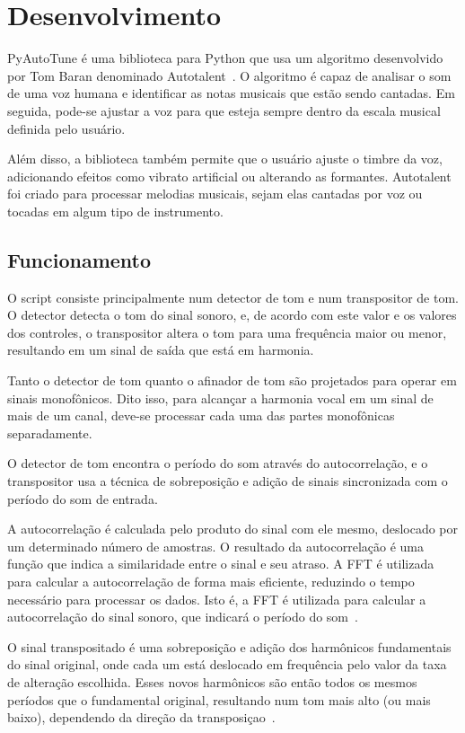 \documentclass{sbrt}
\begin{document}
\section{Desenvolvimento}

PyAutoTune é uma biblioteca para Python que usa um algoritmo desenvolvido por Tom Baran denominado Autotalent~\cite{baran2011autotalent}. O algoritmo é capaz de analisar o som de uma voz humana e identificar as notas musicais que estão sendo cantadas. Em seguida, pode-se ajustar a voz para que esteja sempre dentro da escala musical definida pelo usuário.

Além disso, a biblioteca também permite que o usuário ajuste o timbre da voz, adicionando efeitos como vibrato artificial ou alterando as formantes. Autotalent foi criado para processar melodias musicais, sejam elas cantadas por voz ou tocadas em algum tipo de instrumento.

\subsection{Funcionamento}

O script consiste principalmente num detector de tom e num transpositor de tom. O detector detecta o tom do sinal sonoro, e, de acordo com este valor e os valores dos controles, o transpositor altera o tom para uma frequência maior ou menor, resultando em um sinal de saída que está em harmonia.

Tanto o detector de tom quanto o afinador de tom são projetados para operar em sinais monofônicos. Dito isso, para alcançar a harmonia vocal em um sinal de mais de um canal, deve-se processar cada uma das partes monofônicas separadamente.

O detector de tom encontra o período do som através do autocorrelação, e o transpositor usa a técnica de sobreposição e adição de sinais sincronizada com o período do som de entrada.

A autocorrelação é calculada pelo produto do sinal com ele mesmo, deslocado por um determinado número de amostras. O resultado da autocorrelação é uma função que indica a similaridade entre o sinal e seu atraso. A FFT é utilizada para calcular a autocorrelação de forma mais eficiente, reduzindo o tempo necessário para processar os dados. Isto é, a FFT é utilizada para calcular a autocorrelação do sinal sonoro, que indicará o período do som~\cite{myint2010spatial}.

O sinal transpositado é uma sobreposição e adição dos harmônicos fundamentais do sinal original, onde cada um está
deslocado em frequência pelo valor da taxa de alteração escolhida. Esses novos harmônicos são então todos os mesmos
períodos que o fundamental original, resultando num tom mais alto (ou mais baixo), dependendo da direção da
transposiçao~\cite{laprie1998automatic}.
\end{document}
